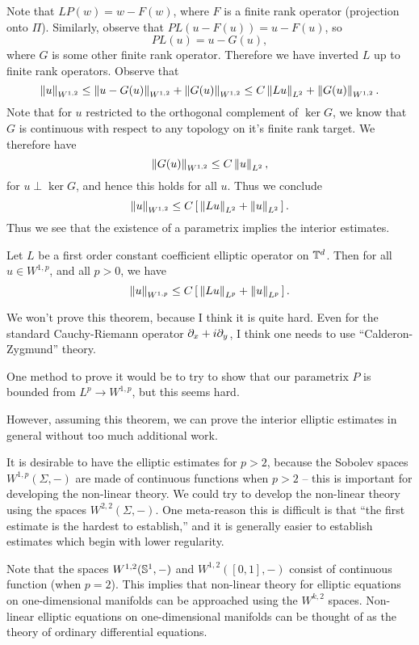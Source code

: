 \documentclass{amsart}
\begin{document}
  Note that $LP(w)=w-F(w)$, where $F$ is a finite rank operator (projection onto $\Pi$). Similarly, observe that $PL(u-F(u))=u-F(u)$, so
  \begin{equation*}
    PL(u)=u-G(u),
  \end{equation*}
  where $G$ is some other finite rank operator. Therefore we have inverted $L$ up to finite rank operators. Observe that
  \begin{equation*}
    \norm{u}_{W^{1,2}}\le \norm{u-G(u)}_{W^{1,2}}+\norm{G(u)}_{W^{1,2}}\le C\norm{Lu}_{L^{2}}+\norm{G(u)}_{W^{1,2}}.
  \end{equation*}
  Note that for $u$ restricted to the orthogonal complement of $\ker G$, we know that $G$ is continuous with respect to any topology on it's finite rank target. We therefore have
  \begin{equation*}
    \norm{G(u)}_{W^{1,2}}\le C\norm{u}_{L^{2}},
  \end{equation*}
  for $u\perp \ker G$, and hence this holds for all $u$. Thus we conclude
  \begin{equation*}
    \norm{u}_{W^{1,2}}\le C\left[\,\norm{Lu}_{L^{2}}+\norm{u}_{L^{2}}\,\right].
  \end{equation*}
  Thus we see that the existence of a parametrix implies the interior estimates.         
\begin{thm}
  Let $L$ be a first order constant coefficient elliptic operator on $\T^{d}$. Then for all $u\in W^{1,p}$, and all $p>0$, we have
  \begin{equation*}
    \norm{u}_{W^{1,p}}\le C\left[\,\norm{Lu}_{L^{p}}+\norm{u}_{L^{p}}\,\right].
  \end{equation*}  
\end{thm}
\begin{remark}
  We won't prove this theorem, because I think it is quite hard. Even for the standard Cauchy-Riemann operator $\bd_{x}+i\bd_{y}$, I think one needs to use ``Calderon-Zygmund'' theory.

  One method to prove it would be to try to show that our parametrix $P$ is bounded from $L^{p}\to W^{1,p}$, but this seems hard.

  However, assuming this theorem, we can prove the interior elliptic estimates in general without too much additional work.

  It is desirable to have the elliptic estimates for $p>2$, because the Sobolev spaces $W^{1,p}(\Sigma,-)$ are made of continuous functions when $p>2$ -- this is important for developing the non-linear theory. We could try to develop the non-linear theory using the spaces $W^{2,2}(\Sigma,-)$. One meta-reason this is difficult is that ``the first estimate is the hardest to establish,'' and it is generally easier to establish estimates which begin with lower regularity.

  Note that the spaces $W^{1,2}(\S^{1},-)$ and $W^{1,2}([0,1],-)$ consist of continuous function (when $p=2$). This implies that non-linear theory for elliptic equations on one-dimensional manifolds can be approached using the $W^{k,2}$ spaces. Non-linear elliptic equations on one-dimensional manifolds can be thought of as the theory of ordinary differential equations.
\end{remark}
\end{document}
